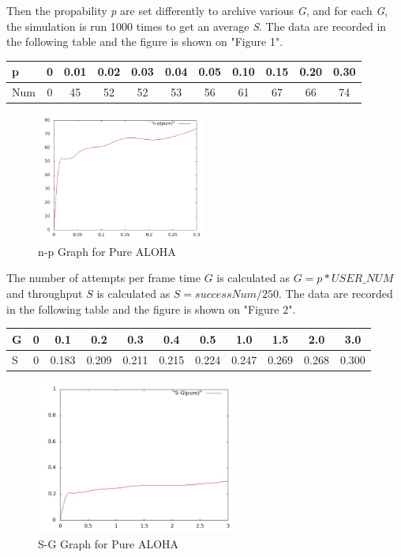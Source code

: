 \documentclass[11pt,a4paper]{report}
\begin{document}
Then the propability \emph{p} are set differently to archive various \emph{G}, and for each \emph{G}, the simulation is run 1000 times to get an average \emph{S}. The data are recorded in the following table and the figure is shown on "Figure 1". \\
\begin{table}[htbp]
\begin{tabular}{lcccccccccc}
\toprule
p & 0 & 0.01 & 0.02  & 0.03 & 0.04 & 0.05 & 0.10 & 0.15 & 0.20 & 0.30 \\
\midrule
Num & 0 & 45 & 52 & 52 & 53 & 56 & 61 & 67 & 66 & 74 \\
\bottomrule
\end{tabular}
\end{table}

\begin{figure}
\centering
\includegraphics[width=0.5\textwidth]{1_1.jpg}
\caption{n-p Graph for Pure ALOHA}
\end{figure}

The number of attempts per frame time \(G\) is calculated as \(G = p*USER\_NUM\) and throughput \(S\) is calculated as \(S = successNum/250\). The data are recorded in the following table and the figure is shown on "Figure 2".
\begin{table}[htbp]
\begin{tabular}{lcccccccccc}
\toprule
G & 0 & 0.1 & 0.2  & 0.3 & 0.4 & 0.5 & 1.0 & 1.5 & 2.0 & 3.0 \\
\midrule
S & 0 & 0.183 & 0.209 & 0.211 & 0.215 & 0.224 & 0.247 & 0.269 & 0.268 & 0.300 \\
\bottomrule
\end{tabular}
\end{table}

\begin{figure}
\centering
\includegraphics[width=0.6\textwidth]{1_2.jpg}
\caption{S-G Graph for Pure ALOHA}
\end{figure}
\end{document}
